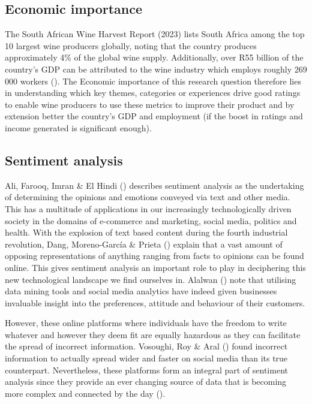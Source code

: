 \documentclass[11pt,preprint]{elsarticle}
\numberwithin{equation}{section}
\numberwithin{figure}{section}
\numberwithin{table}{section}
\begin{document}
\label{LitRev}

\subsection{Economic importance}\label{economic-importance}

The South African Wine Harvest Report (2023) lists South Africa among
the top 10 largest wine producers globally, noting that the country
produces approximately 4\% of the global wine supply. Additionally, over
R55 billion of the country's GDP can be attributed to the wine industry
which employs roughly 269 000 workers (). The Economic importance of this research
question therefore lies in understanding which key themes, categories or
experiences drive good ratings to enable wine producers to use these
metrics to improve their product and by extension better the country's
GDP and employment (if the boost in ratings and income generated is
significant enough).

\subsection{Sentiment analysis}\label{sentiment-analysis}

Ali, Farooq, Imran \& El Hindi ()
describes sentiment analysis as the undertaking of determining the
opinions and emotions conveyed via text and other media. This has a
multitude of applications in our increasingly technologically driven
society in the domains of e-commerce and marketing, social media,
politics and health. With the explosion of text based content during the
fourth industrial revolution, Dang, Moreno-García \& Prieta
() explain that a vast amount of
opposing representations of anything ranging from facts to opinions can
be found online. This gives sentiment analysis an important role to play
in deciphering this new technological landscape we find ourselves in.
Alalwan () note that utilising data
mining tools and social media analytics have indeed given businesses
invaluable insight into the preferences, attitude and behaviour of their
customers.

However, these online platforms where individuals have the freedom to
write whatever and however they deem fit are equally hazardous as they
can facilitate the spread of incorrect information. Vosoughi, Roy \&
Aral () found incorrect information
to actually spread wider and faster on social media than its true
counterpart. Nevertheless, these platforms form an integral part of
sentiment analysis since they provide an ever changing source of data
that is becoming more complex and connected by the day
().
\end{document}
